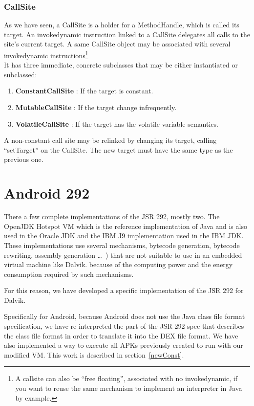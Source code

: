 \documentclass{sig-alternate}
\def \DALVIK{Dalvik\xspace}
\def \Jsr{JSR\xspace}
\def \JSR{\Jsr 292\xspace}
\begin{document}
    \subsubsection{CallSite}

      As we have seen, a CallSite is a holder for a MethodHandle, which is called its target.
      An invokedynamic instruction linked to a CallSite delegates all calls to the site's current target.
      A same CallSite object may be associated with several invokedynamic
      instructions\footnote{A callsite can also be ``free floating'', associated with no invokedynamic,
      if you want to reuse the same mechanism to implement an interpreter in Java by example.}\\

      It has three immediate, concrete subclasses that may be either instantiated or subclassed:
      \begin{enumerate}
        \item \textbf{ConstantCallSite} : If the target is constant.
        \item \textbf{MutableCallSite}  : If the target change infrequently.
        \item \textbf{VolatileCallSite} : If the target has the volatile variable semantics.
      \end{enumerate}
      A non-constant call site may be relinked by changing its target, calling ``setTarget'' on the CallSite.
      The new target must have the same type as the previous one.

\section{Android 292}
  There a few complete implementations of the \JSR, mostly two.
  The OpenJDK Hotspot VM which is the reference implementation of Java and is also used in the Oracle JDK
  and the IBM J9 implementation used in the IBM JDK.
  These implementations use several mechanisms, bytecode generation, bytecode rewriting, assembly generation
  \dots~\cite{jvmsummit-heidinga-mhimpl-2010}\cite{jvmsummit-heidinga-mhimpl-2011}\cite{jvmsummit-rose-mhimpl-2011})
  that are not suitable to use in an embedded virtual machine like \DALVIK.
  because of the computing power and the energy consumption required by such mechanisms.

  For this reason, we have developed a specific implementation of the \JSR for \DALVIK.

  Specifically for Android, because Android does not use the Java class file format specification,
  we have re-interpreted the part of the JSR 292 spec that describes the class file format
  in order to translate it into the DEX file format.
  We have also implemented a way to execute all APKs previously created to run with our modified VM.
  This work is described in section~\ref{newConst}.
  
\end{document}
